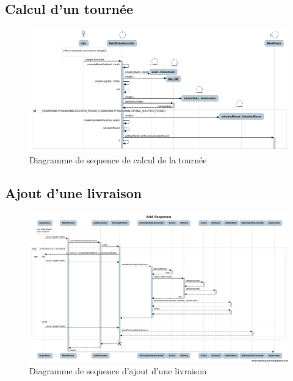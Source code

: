 \begin{landscape}
    \subsection{Calcul d'un tourn\'ee}

    \begin{figure}[h]
        \centering
        \includegraphics[width=240mm]{../diagrams/sequences/computeRound.png}
        \caption{Diagramme de sequence de calcul de la tourn\'ee}
        \label{diagram:seq_compute_round}
    \end{figure}
\end{landscape}
\pagebreak

\begin{landscape}
    \subsection{Ajout d'une livraison}

    \begin{figure}[h]
        \centering
        \includegraphics[width=190mm]{../diagrams/sequences/addSequence.png}
        \caption{Diagramme de sequence d'ajout d'une livraison}
        \label{diagram:seq_add_delivery}
    \end{figure}
\end{landscape}
\pagebreak

